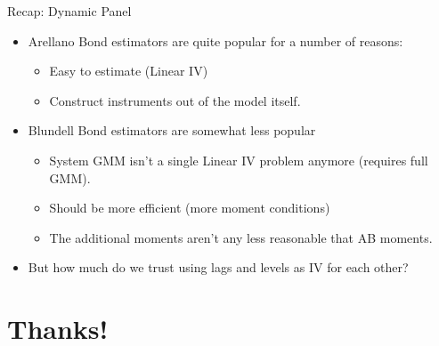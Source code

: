 \documentclass[xcolor=pdftex,dvipsnames,table,mathserif,aspectratio=169]{beamer}
\begin{document}
\begin{frame}{Recap: Dynamic Panel}
\begin{itemize}
\item Arellano Bond estimators are quite popular for a number of reasons:
\begin{itemize}
\item Easy to estimate (Linear IV)
\item Construct instruments out of the model itself.
\end{itemize}
\item Blundell Bond estimators are somewhat less popular
\begin{itemize}
\item System GMM isn't a single Linear IV problem anymore (requires full GMM).
\item Should be more efficient (more moment conditions)
\item The additional moments aren't any less reasonable that AB moments.
\end{itemize}
\item But how much do we trust using lags and levels as IV for each other?
\end{itemize}
\end{frame}


\section*{Thanks!}
\end{document}
